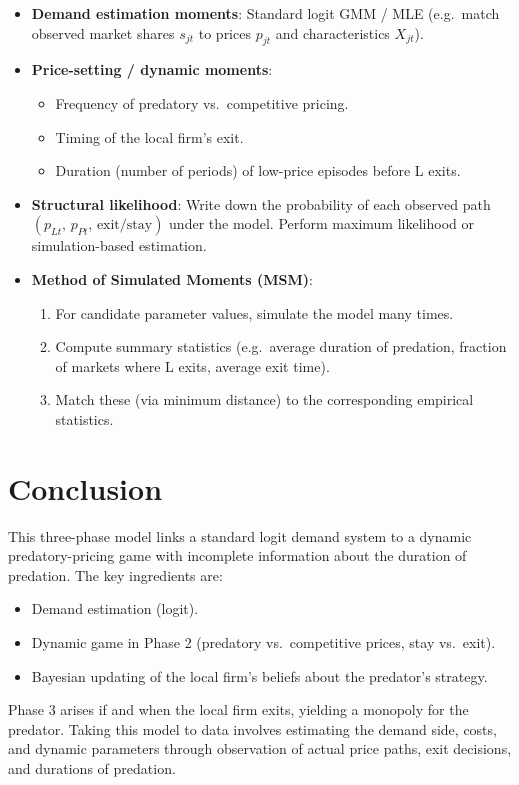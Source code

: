 \documentclass[12pt,oneside]{article}
\theoremstyle{definition}
\theoremstyle{remark}
\begin{document}
\begin{itemize}
  \item \textbf{Demand estimation moments}: Standard logit GMM / MLE (e.g.\ match observed market shares $s_{jt}$ to prices $p_{jt}$ and characteristics $X_{jt}$).
  \item \textbf{Price-setting / dynamic moments}:
  \begin{itemize}
    \item Frequency of predatory vs.\ competitive pricing.
    \item Timing of the local firm's exit.
    \item Duration (number of periods) of low-price episodes before L exits.
  \end{itemize}
  \item \textbf{Structural likelihood}: Write down the probability of each observed path $(p_{Lt},\,p_{Pt},\,\text{exit/stay})$ under the model. Perform maximum likelihood or simulation-based estimation.
  \item \textbf{Method of Simulated Moments (MSM)}:
  \begin{enumerate}
    \item For candidate parameter values, simulate the model many times.
    \item Compute summary statistics (e.g.\ average duration of predation, fraction of markets where L exits, average exit time).
    \item Match these (via minimum distance) to the corresponding empirical statistics.
  \end{enumerate}
\end{itemize}

\section*{Conclusion}

This three-phase model links a standard logit demand system to a dynamic predatory-pricing game with incomplete information about the duration of predation. The key ingredients are:
\begin{itemize}
  \item Demand estimation (logit).
  \item Dynamic game in Phase 2 (predatory vs.\ competitive prices, stay vs.\ exit).
  \item Bayesian updating of the local firm's beliefs about the predator's strategy.
\end{itemize}
Phase 3 arises if and when the local firm exits, yielding a monopoly for the predator. Taking this model to data involves estimating the demand side, costs, and dynamic parameters through observation of actual price paths, exit decisions, and durations of predation.
\end{document}
